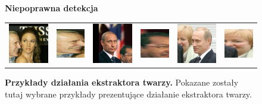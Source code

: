 \begin{figure}[H]
\begin{center}
\begin{tabular}{cc||cc||cc}
    \end{tabular}
    {\bf Niepoprawna detekcja}
    \begin{tabular}{cc||cc||cc}
      \includegraphics[width=.15\linewidth]{img/crop_examples/before/bad/Jennifer_Lopez_0020.jpg} &
      \includegraphics[width=.15\linewidth]{img/crop_examples/after/bad/Jennifer_Lopez_0020.jpg} &
      \includegraphics[width=.15\linewidth]{img/crop_examples/before/bad/Vladimir_Putin_0031.jpg} &
      \includegraphics[width=.15\linewidth]{img/crop_examples/after/bad/Vladimir_Putin_0031.jpg} &
      \includegraphics[width=.15\linewidth]{img/crop_examples/before/bad/Vladimir_Putin_0040.jpg} &
      \includegraphics[width=.15\linewidth]{img/crop_examples/after/bad/Vladimir_Putin_0040.jpg} \\
    \end{tabular}
    \end{center}
    \caption{{\bf Przykłady działania ekstraktora twarzy.} Pokazane zostały tutaj wybrane przykłady prezentujące działanie ekstraktora twarzy.}
    \label{fig:ekstraktor_twarzy}
    \end{figure}

